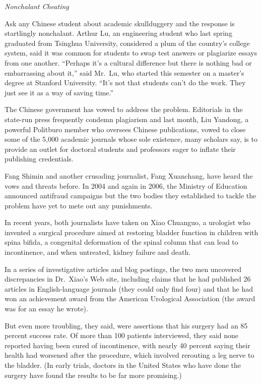 ﻿\documentclass[12pt]{article}
\begin{document}
\emph{Nonchalant Cheating}

Ask any Chinese student about academic skullduggery and the response is startlingly nonchalant.
Arthur Lu, an engineering student who last spring graduated from Tsinghua University, considered a
plum of the country's college system, said it was common for students to swap test answers or
plagiarize essays from one another. ``Perhaps it's a cultural difference but there is nothing bad or
embarrassing about it,'' said Mr.~Lu, who started this semester on a master's degree at Stanford
University. ``It's not that students can't do the work. They just see it as a way of saving time.''

The Chinese government has vowed to address the problem. Editorials in the state-run press
frequently condemn plagiarism and last month, Liu Yandong, a powerful Politburo member who oversees
Chinese publications, vowed to close some of the 5,000 academic journals whose sole existence, many
scholars say, is to provide an outlet for doctoral students and professors eager to inflate their
publishing credentials.

Fang Shimin and another crusading journalist, Fang Xuanchang, have heard the vows and threats
before. In 2004 and again in 2006, the Ministry of Education announced antifraud campaigns but the
two bodies they established to tackle the problem have yet to mete out any punishments.

In recent years, both journalists have taken on Xiao Chuanguo, a urologist who invented a surgical
procedure aimed at restoring bladder function in children with spina bifida, a congenital
deformation of the spinal column that can lead to incontinence, and when untreated, kidney failure
and death.

In a series of investigative articles and blog postings, the two men uncovered discrepancies in
Dr.~Xiao's Web site, including claims that he had published 26 articles in English-language journals
(they could only find four) and that he had won an achievement award from the American Urological
Association (the award was for an essay he wrote).

But even more troubling, they said, were assertions that his surgery had an 85 percent success rate.
Of more than 100 patients interviewed, they said none reported having been cured of incontinence,
with nearly 40 percent saying their health had worsened after the procedure, which involved
rerouting a leg nerve to the bladder. (In early trials, doctors in the United States who have done
the surgery have found the results to be far more promising.)
\end{document}
